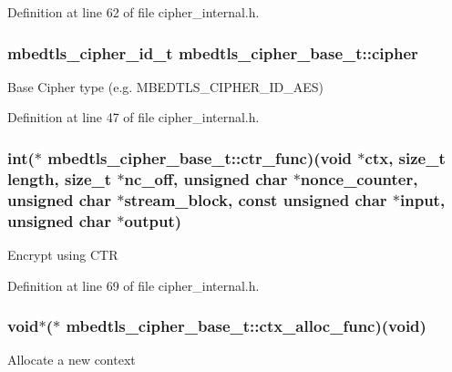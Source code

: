 Definition at line 62 of file cipher\-\_\-internal.\-h.

\hypertarget{structmbedtls__cipher__base__t_a0c4c819c23b0a579445f92a4bee7d577}{
\subsubsection[{cipher}]{\setlength{\rightskip}{0pt plus 5cm}mbedtls\-\_\-cipher\-\_\-id\-\_\-t mbedtls\-\_\-cipher\-\_\-base\-\_\-t\-::cipher}}\label{structmbedtls__cipher__base__t_a0c4c819c23b0a579445f92a4bee7d577}
Base Cipher type (e.\-g. M\-B\-E\-D\-T\-L\-S\-\_\-\-C\-I\-P\-H\-E\-R\-\_\-\-I\-D\-\_\-\-A\-E\-S) 

Definition at line 47 of file cipher\-\_\-internal.\-h.

\hypertarget{structmbedtls__cipher__base__t_aa80b801b6e776896bffb0869b01c1781}{
\subsubsection[{ctr\-\_\-func}]{\setlength{\rightskip}{0pt plus 5cm}int($\ast$ mbedtls\-\_\-cipher\-\_\-base\-\_\-t\-::ctr\-\_\-func)(void $\ast$ctx, size\-\_\-t length, size\-\_\-t $\ast$nc\-\_\-off, unsigned char $\ast$nonce\-\_\-counter, unsigned char $\ast$stream\-\_\-block, const unsigned char $\ast$input, unsigned char $\ast$output)}}\label{structmbedtls__cipher__base__t_aa80b801b6e776896bffb0869b01c1781}
Encrypt using C\-T\-R 

Definition at line 69 of file cipher\-\_\-internal.\-h.

\hypertarget{structmbedtls__cipher__base__t_a0ea058a70ad20f77afdbb27347e876a0}{
\subsubsection[{ctx\-\_\-alloc\-\_\-func}]{\setlength{\rightskip}{0pt plus 5cm}void$\ast$($\ast$ mbedtls\-\_\-cipher\-\_\-base\-\_\-t\-::ctx\-\_\-alloc\-\_\-func)(void)}}\label{structmbedtls__cipher__base__t_a0ea058a70ad20f77afdbb27347e876a0}
Allocate a new context 

